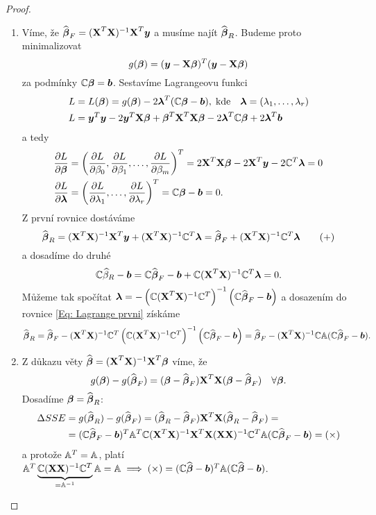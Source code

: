 \begin{proof}
\begin{enumerate}
\item 
Víme, že $\wbetab_F = \xtx \X^T \yb$ a musíme najít $\wbetab_R$. Budeme proto minimalizovat
$$
g(\betab) = (\yb - \X \betab)^T(\yb - \X \betab)
$$
za podmínky $\C \betab = \bb$. Sestavíme Lagrangeovu funkci
\begin{align*}
L & = L(\betab) = g(\betab) - 2 \lambdab^T(\C \betab - \bb), \; \text{kde} \quad \lambdab = (\lambda_1, \dots, \lambda_r) \\
L & = \yb^T \yb - 2 \yb^T \X \betab + \betab^T \X^T \X \betab - 2 \lambdab^T \C \betab + 2 \lambdab^T \bb
\end{align*}
a tedy
\begin{align*}
\frac{\partial L}{\partial \betab} & = \left( \parcialni{L}{\beta_0}, \parcialni{L}{\beta_1}, \dots, \parcialni{L}{\beta_m} \right)^T = 2 \X^T \X \betab - 2 \X^T \yb - 2 \C^T \lambdab = 0 \\
\parcialni{L}{\lambdab} & = \left( \parcialni{L}{\lambda_1}, \dots, \parcialni{L}{\lambda_r} \right)^T = \C \betab - \bb = 0.
\end{align*}
Z první rovnice dostáváme
\begin{equation}
\wbetab_R = \xtx \X^T \yb + \xtx \C^T \lambdab = \wbetab_F + \xtx \C^T \lambdab \tag{+} \label{Eq: Lagrange prvni}
\end{equation}
a dosadíme do druhé
$$
\C \wbeta_R - \bb = \C \wbetab_F - \bb + \C \xtx \C^T \lambdab = 0.
$$
Můžeme tak spočítat $\lambdab = -\left(\C \xtx \C^T\right)^{-1} \left( \C \wbetab_F - \bb \right)$ a dosazením do rovnice \eqref{Eq: Lagrange prvni} získáme
$$
\wbetab_R = \wbetab_F - \xtx \C^T \left( \C \xtx \C^T \right)^{-1} \left( \C \wbetab_F - \bb \right)= \wbetab_F - \xtx \C \Am (\C \wbetab_F - \bb).
$$

\item 
Z důkazu věty $\wbetab = \xtx \X^T \betab$ víme, že 
$$
g(\betab) - g(\wbetab_F) = (\betab - \wbetab_F) \X^T \X (\betab - \wbetab_F) \quad \forall \betab.
$$
Dosadíme $\betab = \wbetab_R$:
\begin{align*}
	\Delta SSE & = g(\wbetab_R) - g(\wbetab_F) = (\wbetab_R - \wbetab_F) \X^T \X (\wbetab_R - \wbetab_F) = \\
	& = (\C \wbetab_F - \bb)^T \Am^T \C \xtx \X^T \X (\X \X )^{-1} \C^T \Am (\C \wbetab_F - \bb) = (\times)
\end{align*}
a protože $\Am^T = \Am$, platí $\Am^T\underbrace{\C (\X \X)^{-1} \C^T}_{= \Am^{-1}} \Am = \Am \implies (\times) = (\C \wbetab - \bb)^T \Am (\C \wbetab - \bb)$.

\end{enumerate}
\end{proof}

